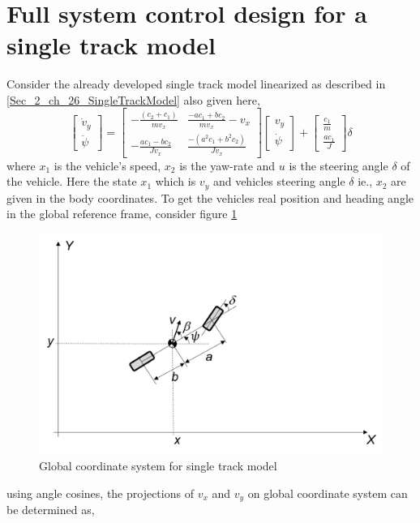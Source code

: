 \section{Full system control design for a single track model}

Consider the already developed single track model linearized as described in \ref{Sec_2_ch_26_SingleTrackModel} also given here,
\begin{equation} \label{Eq_2_ch_27_Model_2_1}
\begin{bmatrix}\dot{v}_y \\ \ddot{\psi} \end{bmatrix} = \begin{bmatrix} -\frac{(c_2 + c_1)}{m v_x} & \frac{-a c_1 + b c_2}{m v_x} - v_x \\
-\frac{a c_1 - b c_2}{J v_x} & \frac{-(a^{2} c_1 + b^{2} c_2)}{J v_x} \end{bmatrix}\begin{bmatrix} v_y \\ \dot{\psi} \end{bmatrix} + \begin{bmatrix} \frac{c_1}{m} \\ \frac{a c_1}{J} \end{bmatrix} \delta
\end{equation}
where $x_1$ is the vehicle's speed, $x_2$ is the yaw-rate and $u$ is the steering angle $\delta$ of the vehicle. Here the state $x_1$ which is $v_y$ and vehicles steering angle $\delta$ ie., $x_2$ are given in the body coordinates. To get the vehicles real position and heading angle in the global reference frame, consider figure \ref{fig_2_ch_27_Model2_1}
\begin{figure}[h!]
	\centering
	\includegraphics[width=0.7\linewidth]{Bilder/FE_coordinate_system_intro.png}
	\caption{Global coordinate system for single track model}
	\label{fig_2_ch_27_Model2_1}
\end{figure}
using angle cosines, the projections of $v_x$ and $v_y$ on global coordinate system can be determined as,
